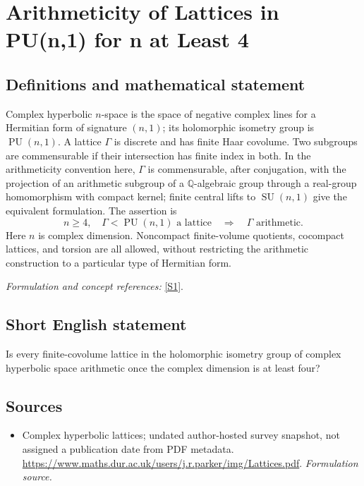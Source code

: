 \documentclass[11pt]{article}
\begin{document}
\section*{\texorpdfstring{Arithmeticity of Lattices in PU(n,1) for n at Least 4}{Arithmeticity of Lattices in PU(n,1) for n at Least 4}}\label{351}
\subsection{Definitions and mathematical statement}
Complex hyperbolic $n$-space is the space of negative complex lines for a Hermitian form of signature $(n,1)$; its holomorphic isometry group is $\operatorname{PU}(n,1)$. A lattice $\Gamma$ is discrete and has finite Haar covolume. Two subgroups are commensurable if their intersection has finite index in both. In the arithmeticity convention here, $\Gamma$ is commensurable, after conjugation, with the projection of an arithmetic subgroup of a ${\mathbb{Q}}$-algebraic group through a real-group homomorphism with compact kernel; finite central lifts to $\operatorname{SU}(n,1)$ give the equivalent formulation. The assertion is
\[
 n\ge4,\quad\Gamma<\operatorname{PU}(n,1)\text{ a lattice}
 \quad\Longrightarrow\quad\Gamma\text{ arithmetic}.
\]
Here $n$ is complex dimension. Noncompact finite-volume quotients, cocompact lattices, and torsion are all allowed, without restricting the arithmetic construction to a particular type of Hermitian form.
\par\smallskip\textit{Formulation and concept references:} \href{https://www.maths.dur.ac.uk/users/j.r.parker/img/Lattices.pdf}{[S1]}.

\subsection{Short English statement}
Is every finite-covolume lattice in the holomorphic isometry group of complex hyperbolic space arithmetic once the complex dimension is at least four?
\subsection{Sources}
\begin{itemize}
\item[S1]Complex hyperbolic lattices; undated author-hosted survey snapshot, not assigned a publication date from PDF metadata.
\url{https://www.maths.dur.ac.uk/users/j.r.parker/img/Lattices.pdf}.
\textit{Formulation source.}
\end{itemize}
\end{document}
